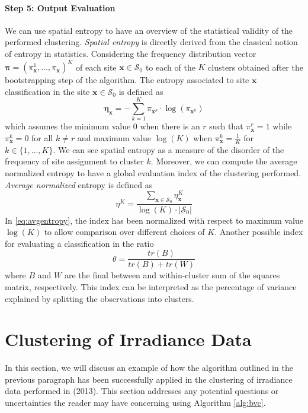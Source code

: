 \paragraph{Step 5: Output Evaluation} We can use spatial entropy to have an overview of the statistical validity of the performed clustering. \emph{Spatial entropy} is directly derived from the classical notion of entropy in statistics. Considering the frequency distribution vector $\boldsymbol{\pi}=(\pi_{\mathbf{x}}^1,\dots,\pi_{\mathbf{x}})^K$ of each site $\mathbf{x} \in \mathcal{S}_0$ to each of the $K$ clusters obtained after the bootstrapping step of the algorithm. The entropy associated to site $\mathbf{x}$ classification in the site $\mathbf{x}\in\mathcal{S}_0$ is defined as
\begin{equation}
\mathbf{\eta}_{\mathbf{x}}=-\sum_{k=1}^K\pi_{\mathbf{x}^k}\cdot \log(\pi_{\mathbf{x}^k})
\end{equation}
which assumes the minimum value 0 when there is an $r$ such that $\pi_{\mathbf{x}}^r=1$ while $\pi_{\mathbf{x}}^k=0$ for all $k\neq r$ and maximum value $\log(K)$ when $\pi_{\mathbf{x}}^k=\frac{1}{K}$ for $k\in\{1,\dots,K\}$. We can see spatial entropy as a measure of the disorder of the frequency of site assignment to cluster $k$. Moreover, we can compute the average normalized entropy to have a global evaluation index of the clustering performed. \emph{Average normalized} entropy is defined as
\begin{equation}
\label{eq:avgentropy}
    \eta^K=\frac{\sum_{\textbf{x}\in\mathcal{S}_0}\eta_{\mathbf{x}}^K}{\log(K)\cdot |\mathcal{S}_0|}
\end{equation}
In \ref{eq:avgentropy}, the index has been normalized with respect to maximum value $\log(K)$ to allow comparison over different choices of $K$. Another possible index for evaluating a classification in the ratio
\begin{equation}
    \label{eq:theta}
    \theta=\frac{tr(B)}{tr(B)+tr(W)}
\end{equation}
where $B$ and $W$ are the final between and within-cluster sum of the squares matrix, respectively. This index can be interpreted as the percentage of variance explained by splitting the observations into clusters.
\section{Clustering of Irradiance Data}
\label{sec:irradiance}
In this section, we will discuss an example of how the algorithm outlined in the previous paragraph has been successfully applied in the clustering of irradiance data performed in \citeauthor{secchi_bagging_2013} (2013). This section addresses any potential questions or uncertainties the reader may have concerning using Algorithm \ref{alg:bvc}. 

